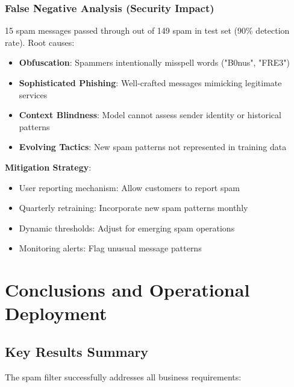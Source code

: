 \documentclass[12pt,a4paper]{article}
\begin{document}
\subsubsection{False Negative Analysis (Security Impact)}

15 spam messages passed through out of 149 spam in test set (90\% detection rate). Root causes:

\begin{itemize}
    \item \textbf{Obfuscation}: Spammers intentionally misspell words ("B0nus", "FRE3")
    \item \textbf{Sophisticated Phishing}: Well-crafted messages mimicking legitimate services
    \item \textbf{Context Blindness}: Model cannot assess sender identity or historical patterns
    \item \textbf{Evolving Tactics}: New spam patterns not represented in training data
\end{itemize}

\textbf{Mitigation Strategy}:
\begin{itemize}
    \item User reporting mechanism: Allow customers to report spam
    \item Quarterly retraining: Incorporate new spam patterns monthly
    \item Dynamic thresholds: Adjust for emerging spam operations
    \item Monitoring alerts: Flag unusual message patterns
\end{itemize}

\section{Conclusions and Operational Deployment}

\subsection{Key Results Summary}

The spam filter successfully addresses all business requirements:
\end{document}

